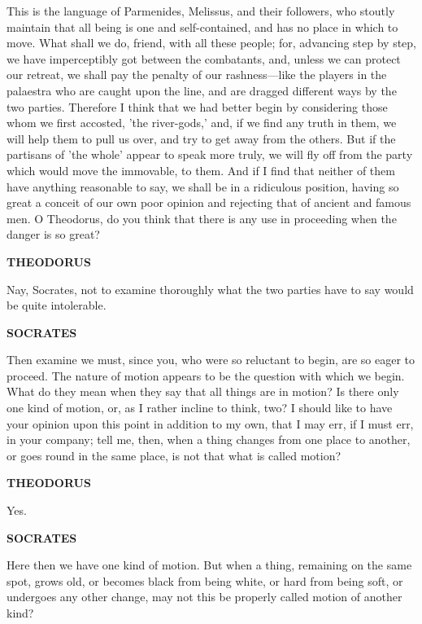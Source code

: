 \documentclass[11pt,letter]{article}
\begin{document}
\par  This is the language of Parmenides, Melissus, and their followers, who stoutly maintain that all being is one and self-contained, and has no place in which to move. What shall we do, friend, with all these people; for, advancing step by step, we have imperceptibly got between the combatants, and, unless we can protect our retreat, we shall pay the penalty of our rashness—like the players in the palaestra who are caught upon the line, and are dragged different ways by the two parties. Therefore I think that we had better begin by considering those whom we first accosted, 'the river-gods,' and, if we find any truth in them, we will help them to pull us over, and try to get away from the others. But if the partisans of 'the whole' appear to speak more truly, we will fly off from the party which would move the immovable, to them. And if I find that neither of them have anything reasonable to say, we shall be in a ridiculous position, having so great a conceit of our own poor opinion and rejecting that of ancient and famous men. O Theodorus, do you think that there is any use in proceeding when the danger is so great?

\par \textbf{THEODORUS}
\par   Nay, Socrates, not to examine thoroughly what the two parties have to say would be quite intolerable.

\par \textbf{SOCRATES}
\par   Then examine we must, since you, who were so reluctant to begin, are so eager to proceed. The nature of motion appears to be the question with which we begin. What do they mean when they say that all things are in motion? Is there only one kind of motion, or, as I rather incline to think, two? I should like to have your opinion upon this point in addition to my own, that I may err, if I must err, in your company; tell me, then, when a thing changes from one place to another, or goes round in the same place, is not that what is called motion?

\par \textbf{THEODORUS}
\par   Yes.

\par \textbf{SOCRATES}
\par   Here then we have one kind of motion. But when a thing, remaining on the same spot, grows old, or becomes black from being white, or hard from being soft, or undergoes any other change, may not this be properly called motion of another kind?
\end{document}
